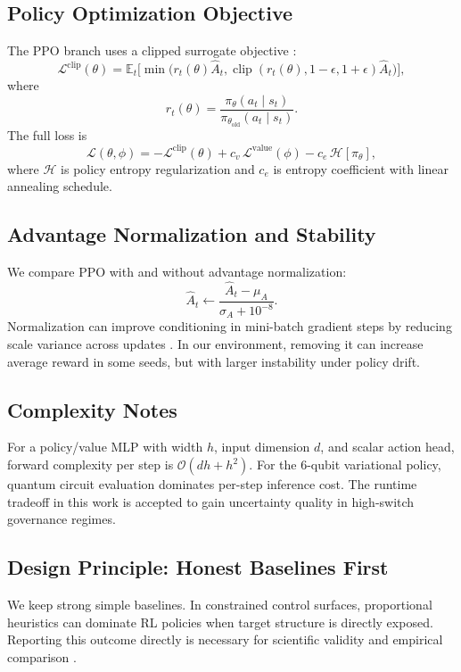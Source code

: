 \subsection{Policy Optimization Objective}

The PPO branch uses a clipped surrogate objective \cite{schulman2017ppo}:
\begin{equation}
\mathcal{L}^{\text{clip}}(\theta) = \mathbb{E}_t\Big[\min\big(r_t(\theta)\hat{A}_t, \operatorname{clip}(r_t(\theta), 1-\epsilon, 1+\epsilon)\hat{A}_t\big)\Big],
\end{equation}
where
\begin{equation}
r_t(\theta) = \frac{\pi_\theta(a_t\mid s_t)}{\pi_{\theta_{\text{old}}}(a_t\mid s_t)}.
\end{equation}
The full loss is
\begin{equation}
\mathcal{L}(\theta, \phi) = -\mathcal{L}^{\text{clip}}(\theta) + c_v\,\mathcal{L}^{\text{value}}(\phi) - c_e\,\mathcal{H}[\pi_\theta],
\end{equation}
where $\mathcal{H}$ is policy entropy regularization and $c_e$ is entropy coefficient with linear annealing schedule.

\subsection{Advantage Normalization and Stability}

We compare PPO with and without advantage normalization:
\begin{equation}
\hat{A}_t \leftarrow \frac{\hat{A}_t - \mu_A}{\sigma_A + 10^{-8}}.
\end{equation}
Normalization can improve conditioning in mini-batch gradient steps by reducing scale variance across updates \cite{sutton2018reinforcement}. In our environment, removing it can increase average reward in some seeds, but with larger instability under policy drift.

\subsection{Complexity Notes}

For a policy/value MLP with width $h$, input dimension $d$, and scalar action head, forward complexity per step is $\mathcal{O}(dh + h^2)$. For the 6-qubit variational policy, quantum circuit evaluation dominates per-step inference cost. The runtime tradeoff in this work is accepted to gain uncertainty quality in high-switch governance regimes.

\subsection{Design Principle: Honest Baselines First}

We keep strong simple baselines. In constrained control surfaces, proportional heuristics can dominate RL policies when target structure is directly exposed. Reporting this outcome directly is necessary for scientific validity and empirical comparison \cite{pineau2021improving}.
